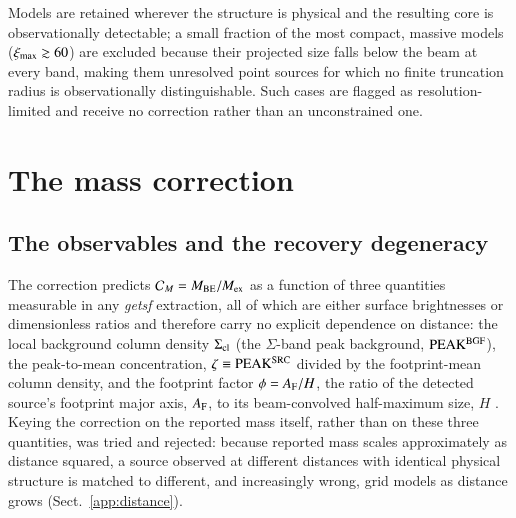 \documentclass{aa}
\newcommand{\Scloud}{\Sigma_{\rm cl}}
\newcommand{\ximax}{\xi_{\rm max}}
\newcommand{\CM}{\mathcal{C}_{M}}
\newcommand{\Mex}{M_{\rm ex}}
\newcommand{\Mbe}{M_{\rm BE}}
\begin{document}
Models are retained wherever the structure is physical and the resulting
core is observationally detectable; a small fraction of the most compact,
massive models ($\ximax\gtrsim60$) are excluded because their projected size
falls below the beam at every band, making them unresolved point sources
for which no finite truncation radius is observationally distinguishable.
Such cases are flagged as resolution-limited and receive no correction
rather than an unconstrained one.

\section{The mass correction}
\label{sec:correction}

\subsection{The observables and the recovery degeneracy}
\label{sec:observables}

The correction predicts $\CM=\Mbe/\Mex$ as a function of
three quantities measurable in any \emph{getsf} extraction, all of which are
either surface brightnesses or dimensionless ratios and therefore carry no
explicit dependence on distance: the local background column density
$\Scloud$ (the $\Sigma$-band peak background, ${\rm PEAK^{BGF}}$), the
peak-to-mean concentration, $\zeta\equiv{\rm PEAK^{SRC}}$ divided by the
footprint-mean column density, and the footprint factor
$\phi=A_{\rm F}/H$, the ratio of the detected source's footprint major
axis, $A_{\rm F}$, to its beam-convolved half-maximum size, $H$
\citep[following the terminology of][]{Menshchikov2021}. Keying the
correction on the reported mass itself, rather than on these three
quantities, was tried and rejected: because reported mass scales
approximately as distance squared, a source observed at different distances
with identical physical structure is matched to different, and increasingly
wrong, grid models as distance grows (Sect.~\ref{app:distance}).
\end{document}
